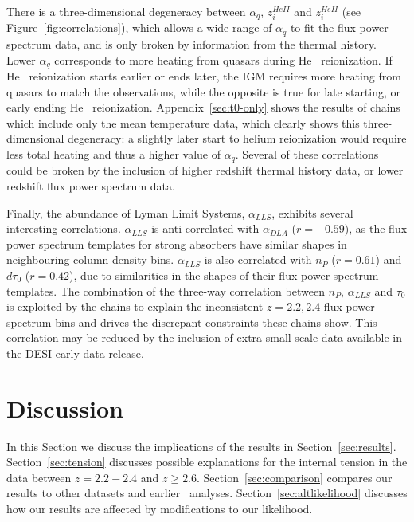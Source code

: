 There is a three-dimensional degeneracy between $\alpha_q$, $z_i^{HeII}$ and $z_i^{HeII}$ (see Figure~\ref{fig:correlations}), which allows a wide range of $\alpha_q$ to fit the flux power spectrum data, and is only broken by information from the thermal history.
Lower $\alpha_q$ corresponds to more heating from quasars during He~{} reionization.
If He~{} reionization starts earlier or ends later, the IGM requires more heating from quasars to match the observations, while the opposite is true for late starting, or early ending He~{} reionization.
Appendix~\ref{sec:t0-only} shows the results of chains which include only the mean temperature data, which clearly shows this three-dimensional degeneracy: a slightly later start to helium reionization would require less total heating and thus a higher value of $\alpha_q$. 
Several of these correlations could be broken by the inclusion of higher redshift thermal history data, or lower redshift flux power spectrum data. 

Finally, the abundance of Lyman Limit Systems, $\alpha_{LLS}$, exhibits several interesting correlations.
$\alpha_{LLS}$ is anti-correlated with $\alpha_{DLA}$ ($r= - 0.59$), as the flux power spectrum templates for strong absorbers have similar shapes in neighbouring column density bins.
$\alpha_{LLS}$ is also correlated with $n_P$ ($r=0.61$) and $d\tau_0$ ($r=0.42$), due to similarities in the shapes of their flux power spectrum templates.
The combination of the three-way correlation between $n_P$, $\alpha_{LLS}$ and $\tau_0$ is exploited by the chains to explain the inconsistent $z=2.2, 2.4$ flux power spectrum bins and drives the discrepant constraints these chains show.
This correlation may be reduced by the inclusion of extra small-scale data available in the DESI early data release.

\section{Discussion}
\label{sec:discussion}

In this Section we discuss the implications of the results in Section~\ref{sec:results}. 
Section~\ref{sec:tension} discusses possible explanations for the internal tension in the data between $z = 2.2 - 2.4$ and $z \geq 2.6$.
Section~\ref{sec:comparison} compares our results to other datasets and earlier \Lya~analyses.
Section~\ref{sec:altlikelihood} discusses how our results are affected by modifications to our likelihood.

